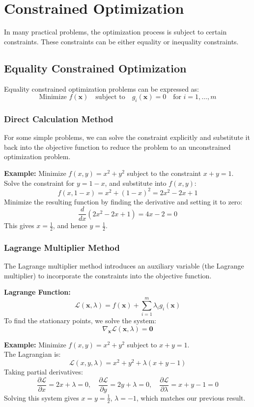 \documentclass[]{article}
\begin{document}
	\section{Constrained Optimization}
	In many practical problems, the optimization process is subject to certain constraints.
	These constraints can be either equality or inequality constraints.
	
	\subsection{Equality Constrained Optimization}
	Equality constrained optimization problems can be expressed as:
	$$
	\text{Minimize } f(\mathbf{x})
	\quad
	\text{subject to}
	\quad
	g_i(\mathbf{x}) = 0
	\quad
	\text{for } i = 1, \dots, m
	$$
	
	\subsubsection{Direct Calculation Method}
	For some simple problems, we can solve the constraint explicitly and substitute it back into the objective function to reduce the problem to an unconstrained optimization problem.
	
	\textbf{Example:}
	Minimize $f(x, y) = x^2 + y^2$ subject to the constraint $x + y = 1$.
	\\
	Solve the constraint for $y = 1 - x$, and substitute into $f(x, y)$:
	$$
	f(x, 1-x) = x^2 + (1-x)^2 = 2x^2 - 2x + 1
	$$
	Minimize the resulting function by finding the derivative and setting it to zero:
	$$
	\frac{d}{dx}(2x^2 - 2x + 1) = 4x - 2 = 0
	$$
	This gives $x = \frac{1}{2}$, and hence $y = \frac{1}{2}$.
	
	\subsubsection{Lagrange Multiplier Method}
	The Lagrange multiplier method introduces an auxiliary variable (the Lagrange multiplier) to incorporate the constraints into the objective function.
	
	\textbf{Lagrange Function:}
	$$
	\mathcal{L}(\mathbf{x}, \lambda) = f(\mathbf{x}) + \sum_{i=1}^m \lambda_i g_i(\mathbf{x})
	$$
	To find the stationary points, we solve the system:
	$$
	\nabla_\mathbf{x} \mathcal{L}(\mathbf{x}, \lambda) = \mathbf{0}
	$$
	
	\textbf{Example:}
	Minimize $f(x, y) = x^2 + y^2$ subject to $x + y = 1$.
	\\
	The Lagrangian is:
	$$
	\mathcal{L}(x, y, \lambda) = x^2 + y^2 + \lambda (x + y - 1)
	$$
	Taking partial derivatives:
	$$
	\frac{\partial \mathcal{L}}{\partial x} = 2x + \lambda = 0, \quad \frac{\partial \mathcal{L}}{\partial y} = 2y + \lambda = 0, \quad \frac{\partial \mathcal{L}}{\partial \lambda} = x + y - 1 = 0
	$$
	Solving this system gives $x = y = \frac{1}{2}$, $\lambda = -1$, which matches our previous result.
	
\end{document}
